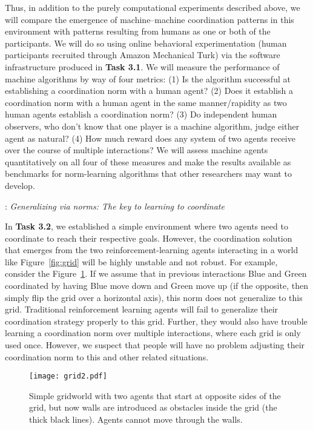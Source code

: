 \documentclass[12pt]{article}
\begin{document}
Thus, in addition to the purely computational experiments described
above, we will compare the emergence of machine--machine coordination
patterns in this environment with patterns resulting from humans as
one or both of the participants. We will do so using online behavioral
experimentation (human participants recruited through Amazon
Mechanical Turk) via the software infrastructure produced in {\bf Task
  3.1}.  We will measure the performance of machine algorithms by way
of four metrics: (1) Is the algorithm successful at establishing a
coordination norm with a human agent? (2) Does it establish a
coordination norm with a human agent in the same manner/rapidity as
two human agents establish a coordination norm? (3) Do independent
human observers, who don't know that one player is a machine
algorithm, judge either agent as natural? (4) How much reward does any
system of two agents receive over the course of multiple interactions?
We will assess machine agents quantitatively on all four of these
measures and make the results available as benchmarks for
norm-learning algorithms that other researchers may want to develop.

\vskip 0.05in
: {\em Generalizing via norms: The key to
  learning to coordinate} 
\vskip 0.05in

\noindent In {\bf Task 3.2}, we established a simple environment where two
agents need to coordinate to reach their respective goals. However,
the coordination solution that emerges from the two
reinforcement-learning agents interacting in a world like
Figure~\ref{fig:grid} will be highly unstable and not robust. For
example, consider the Figure~\ref{fig:grid2}. If we assume that in
previous interactions Blue and Green coordinated by having Blue move
down and Green move up (if the opposite, then simply flip the grid
over a horizontal axis), this norm does not generalize to this
grid. Traditional reinforcement learning agents will fail to
generalize their coordination strategy properly to this grid. Further,
they would also have trouble learning a coordination norm over
multiple interactions, where each grid is only used once. However, we
suspect that people will have no problem adjusting their coordination
norm to this and other related situations.

\begin{figure}[h!]
 \centering
\texttt{[image: grid2.pdf]}
\caption{\small Simple gridworld with two agents that start at
  opposite sides of the grid, but now walls are introduced as obstacles 
  inside the grid (the thick black lines). Agents cannot move through
  the walls.}
  \label{fig:grid2}
\end{figure}
\end{document}
